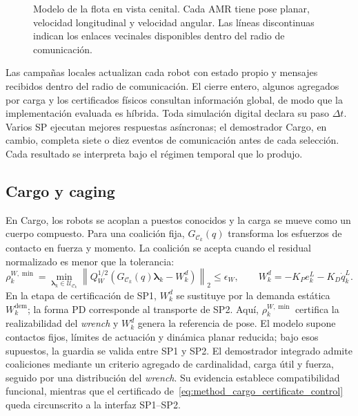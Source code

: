 \begin{figure}[H]
    \caption{Modelo de la flota en vista cenital. Cada AMR tiene pose planar,
    velocidad longitudinal y velocidad angular. Las líneas discontinuas indican
    los enlaces vecinales disponibles dentro del radio de comunicación.}
    \label{fig:method-unicycle-fleet}
    \viuownsource
\end{figure}
\fi

Las campañas locales actualizan cada robot con estado propio y mensajes recibidos
dentro del radio de comunicación. El cierre entero, algunos agregados por carga
y los certificados físicos consultan información global, de modo que la
implementación evaluada es híbrida. Toda simulación digital declara su paso
\(\Delta t\). Varios SP ejecutan mejores respuestas asíncronas; el demostrador
Cargo, en cambio, completa siete o diez eventos de comunicación antes de cada
selección. Cada resultado se interpreta bajo el régimen temporal que lo produjo.

\subsection{Cargo y caging}
\label{sec:method_physical_modes}

En Cargo, los robots se acoplan a puestos conocidos y la carga se mueve como un
cuerpo compuesto. Para una coalición fija, \(G_{\mathcal C_k}(q)\) transforma los
esfuerzos de contacto en fuerza y momento. La coalición se acepta cuando el
residual normalizado es menor que la tolerancia:
\begin{equation}
    \rho_k^{W,\min}=
    \min_{\boldsymbol\lambda_k\in\mathcal U_{\mathcal C_k}}
    \left\|
        Q_W^{1/2}
        \left(G_{\mathcal C_k}(q)\boldsymbol\lambda_k-W_k^d\right)
    \right\|_2
    \leq\epsilon_W,
    \qquad
    W_k^d=-K_Pe_k^L-K_D\dot q_k^L.
    \label{eq:method_cargo_certificate_control}
\end{equation}
En la etapa de certificación de SP1, \(W_k^d\) se sustituye por la demanda estática
\(W_k^{\mathrm{dem}}\); la forma PD corresponde al transporte de SP2.
Aquí, \(\rho_k^{W,\min}\) certifica la realizabilidad del \emph{wrench} y \(W_k^d\)
genera la referencia de pose. El modelo supone contactos fijos, límites de
actuación y dinámica planar reducida; bajo esos supuestos, la guardia se valida
entre SP1 y SP2. El demostrador integrado admite coaliciones mediante un criterio
agregado de cardinalidad, carga útil y fuerza, seguido por una distribución del
\emph{wrench}. Su evidencia establece compatibilidad funcional, mientras que el
certificado de~\eqref{eq:method_cargo_certificate_control} queda circunscrito a
la interfaz SP1--SP2.

